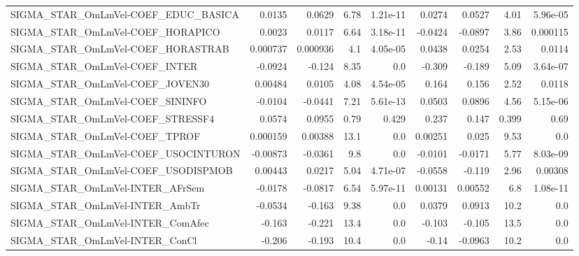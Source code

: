 \begin{tabular}{lrrrrrrrr}
SIGMA\_STAR\_OmLmVel-COEF\_EDUC\_BASICA   &      0.0135 &       0.0629 &     6.78 & 1.21e-11 &     0.0274 &      0.0527 &         4.01 &      5.96e-05 \\
SIGMA\_STAR\_OmLmVel-COEF\_HORAPICO      &      0.0023 &       0.0117 &     6.64 & 3.18e-11 &    -0.0424 &     -0.0897 &         3.86 &      0.000115 \\
SIGMA\_STAR\_OmLmVel-COEF\_HORASTRAB     &    0.000737 &     0.000936 &      4.1 & 4.05e-05 &     0.0438 &      0.0254 &         2.53 &        0.0114 \\
SIGMA\_STAR\_OmLmVel-COEF\_INTER         &     -0.0924 &       -0.124 &     8.35 &      0.0 &     -0.309 &      -0.189 &         5.09 &      3.64e-07 \\
SIGMA\_STAR\_OmLmVel-COEF\_JOVEN30       &     0.00484 &       0.0105 &     4.08 & 4.54e-05 &      0.164 &       0.156 &         2.52 &        0.0118 \\
SIGMA\_STAR\_OmLmVel-COEF\_SININFO       &     -0.0104 &      -0.0441 &     7.21 & 5.61e-13 &     0.0503 &      0.0896 &         4.56 &      5.15e-06 \\
SIGMA\_STAR\_OmLmVel-COEF\_STRESSF4      &      0.0574 &       0.0955 &     0.79 &    0.429 &      0.237 &       0.147 &        0.399 &          0.69 \\
SIGMA\_STAR\_OmLmVel-COEF\_TPROF         &    0.000159 &      0.00388 &     13.1 &      0.0 &    0.00251 &       0.025 &         9.53 &           0.0 \\
SIGMA\_STAR\_OmLmVel-COEF\_USOCINTURON   &    -0.00873 &      -0.0361 &      9.8 &      0.0 &    -0.0101 &     -0.0171 &         5.77 &      8.03e-09 \\
SIGMA\_STAR\_OmLmVel-COEF\_USODISPMOB    &     0.00443 &       0.0217 &     5.04 & 4.71e-07 &    -0.0558 &      -0.119 &         2.96 &       0.00308 \\
SIGMA\_STAR\_OmLmVel-INTER\_AFrSem       &     -0.0178 &      -0.0817 &     6.54 & 5.97e-11 &    0.00131 &     0.00552 &          6.8 &      1.08e-11 \\
SIGMA\_STAR\_OmLmVel-INTER\_AmbTr        &     -0.0534 &       -0.163 &     9.38 &      0.0 &     0.0379 &      0.0913 &         10.2 &           0.0 \\
SIGMA\_STAR\_OmLmVel-INTER\_ComAfec      &      -0.163 &       -0.221 &     13.4 &      0.0 &     -0.103 &      -0.105 &         13.5 &           0.0 \\
SIGMA\_STAR\_OmLmVel-INTER\_ConCl        &      -0.206 &       -0.193 &     10.4 &      0.0 &      -0.14 &     -0.0963 &         10.2 &           0.0 \\

\end{tabular}
